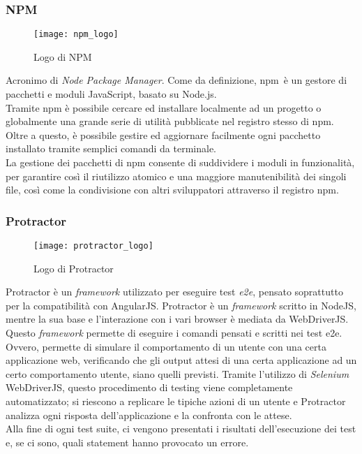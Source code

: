 \subsubsection{NPM}
\begin{figure}[htb] 
    \centering 
    \texttt{[image: npm\_logo]} 
    \caption{Logo di NPM}
\end{figure}
Acronimo di \emph{Node Package Manager}. Come da definizione, \gls{npm}\glsfirstoccur\  è un gestore di pacchetti e moduli JavaScript, basato su Node.js.\\ 
Tramite \gls{npm} è possibile cercare ed installare localmente ad un progetto o globalmente una grande serie di utilità pubblicate nel registro stesso di \gls{npm}. Oltre a questo, è possibile gestire ed aggiornare facilmente ogni pacchetto installato tramite semplici comandi da terminale.\\
La gestione dei pacchetti di npm consente di suddividere i moduli in funzionalità, per garantire così il riutilizzo atomico e una maggiore manutenibilità dei singoli file, così come la condivisione con altri sviluppatori attraverso il registro \gls{npm}. 

\subsubsection{Protractor}
\begin{figure}[htb] 
    \centering 
    \texttt{[image: protractor\_logo]} 
    \caption{Logo di Protractor}
\end{figure}
Protractor è un \emph{framework} utilizzato per eseguire test \emph{e2e}, pensato soprattutto per la compatibilità con AngularJS. Protractor è un \emph{framework} scritto in NodeJS, mentre la sua base e l’interazione con i vari browser è mediata da WebDriverJS.\\
Questo \emph{framework} permette di eseguire i comandi pensati e scritti nei test \gls{e2e}. Ovvero, permette di simulare il comportamento di un utente con una certa applicazione web, verificando che gli output attesi di una certa applicazione ad un certo comportamento utente, siano quelli previsti. Tramite l’utilizzo di \emph{Selenium} WebDriverJS, questo procedimento di testing viene completamente automatizzato; si riescono a replicare le tipiche azioni di un utente e Protractor analizza ogni risposta dell’applicazione e la confronta con le attese.\\
Alla fine di ogni test suite, ci vengono presentati i risultati dell’esecuzione dei test e, se ci sono, quali statement hanno provocato un errore.

